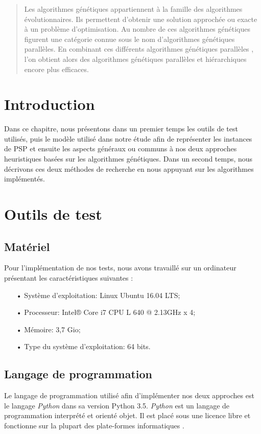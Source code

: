 \begin{abstract}
	Les algorithmes génétiques appartiennent à la famille des algorithmes évolutionnaires. Ils permettent d'obtenir une solution approchée ou exacte à un problème d'optimisation. Au nombre de ces algorithmes génétiques figurent une catégorie connue sous le nom d'algorithmes génétiques parallèles. En combinant ces différents algorithmes génétiques parallèles \cite{cant2}, l'on obtient alors des algorithmes génétiques parallèles et hiérarchiques encore plus efficaces. 
\end{abstract}

\section*{Introduction}
	 Dans ce chapitre, nous présentons dans un premier temps les outils de test utilisés, puis le modèle utilisé dans notre étude afin de représenter les instances de PSP et ensuite les aspects généraux ou communs à nos deux approches heuristiques basées sur les algorithmes génétiques. Dans un second temps, nous décrivons ces deux méthodes de recherche en nous appuyant sur les algorithmes implémentés.
	
	\section{Outils de test} 
		\subsection{Matériel}
		Pour l'implémentation de nos tests, nous avons travaillé sur un ordinateur présentant les caractéristiques suivantes :\\
		\begin{itemize}
			\item[•] Système d'exploitation: Linux Ubuntu 16.04 LTS; 
			\item[•] Processeur: Intel®  Core  i7 CPU L 640 @ 2.13GHz x 4; 
			\item[•] Mémoire: 3,7 Gio;
			\item[•] Type du système d'exploitation: 64 bits.
		\end{itemize}
		
		\subsection{Langage de programmation}
		Le langage de programmation utilisé afin d'implémenter nos deux approches est le langage \emph{Python} dans sa version Python 3.5. \emph{Python} est un langage de programmation interprété et orienté objet. Il est placé sous une licence libre et fonctionne sur la plupart des plate-formes informatiques \cite{wikipedia_python}.
	
